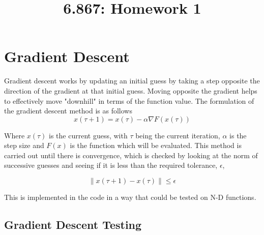 \documentclass[10pt,twocolumn]{article}
\begin{document}
\title{6.867: Homework 1}

\section{Gradient Descent}
Gradient descent works by updating an initial guess by taking a step opposite the direction of the gradient at that initial guess. Moving opposite the gradient helps  to effectively move "downhill" in terms of the function value.  The formulation of the gradient descent method is as follows
\begin{equation}
x(\tau+1) = x(\tau) - \alpha \nabla F(x(\tau))
\end{equation}

Where $ x(\tau)$ is the current guess, with $\tau$ being the current iteration, $\alpha$ is the step size and $F(x)$ is the function which will be evaluated. This method is carried out until there is convergence, which is checked by looking at the norm of successive guesses and seeing if it is less than the required tolerance, $\epsilon$,   



\begin{equation} 
\left \lVert x(\tau+1)-x(\tau) \right \rVert \leq \epsilon
\end{equation}

This is implemented in the code in a way that could be tested on N-D functions. 



\subsection*{ Gradient Descent Testing}
\end{document}
